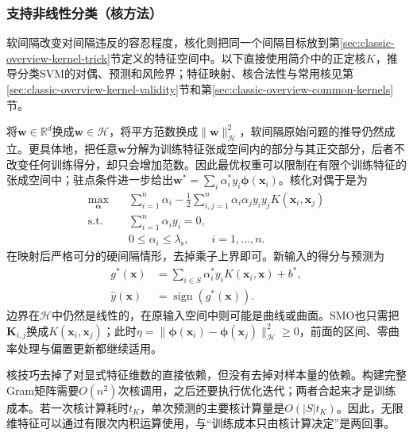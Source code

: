 \subsubsection{支持非线性分类（核方法）}
\label{sec:classification-svm-kernels}

软间隔改变对间隔违反的容忍程度，核化则把同一个间隔目标放到第\ref{sec:classic-overview-kernel-trick}节定义的特征空间中。以下直接使用简介中的正定核$K$，推导分类SVM的对偶、预测和风险界；特征映射、核合法性与常用核见第\ref{sec:classic-overview-kernel-validity}节和第\ref{sec:classic-overview-common-kernels}节。

将$\bm{w}\in\mathbb{R}^d$换成$\bm{w}\in\mathcal{H}$，将平方范数换成$\lVert\bm{w}\rVert_{\mathcal{H}}^2$，软间隔原始问题的推导仍然成立。更具体地，把任意$\bm{w}$分解为训练特征张成空间内的部分与其正交部分，后者不改变任何训练得分，却只会增加范数。因此最优权重可以限制在有限个训练特征的张成空间中；驻点条件进一步给出$\bm{w}^{\ast}=\sum_i\alpha_i^{\ast}y_i\bm{\phi}(\bm{x}_i)$。核化对偶于是为
\begin{equation}
  \begin{aligned}
    \max_{\bm{\alpha}}\quad&
      \sum_{i=1}^n\alpha_i
       -\frac12\sum_{i,j=1}^n
          \alpha_i\alpha_j y_i y_j
          K(\bm{x}_i,\bm{x}_j)\\
    \text{s.t.}\quad&
      \sum_{i=1}^n\alpha_i y_i=0,\\
    &0\le\alpha_i\le\lambda_{\mathrm{s}},
      \qquad i=1,\ldots,n.
  \end{aligned}
  \label{eq:classification-svm-kernel-dual}
\end{equation}
在映射后严格可分的硬间隔情形，去掉乘子上界即可。新输入的得分与预测为
\begin{equation}
  \begin{aligned}
    g^{\ast}(\bm{x})
      &=\sum_{i\in S}\alpha_i^{\ast}y_i
         K(\bm{x}_i,\bm{x})+b^{\ast},\\
    \hat y(\bm{x})&=\operatorname{sign}(g^{\ast}(\bm{x})).
  \end{aligned}
  \label{eq:classification-svm-kernel-prediction}
\end{equation}
边界在$\mathcal{H}$中仍然是线性的，在原输入空间中则可能是曲线或曲面。SMO也只需把$\bm{K}_{i,j}$换成$K(\bm{x}_i,\bm{x}_j)$；此时$\eta=\lVert\bm{\phi}(\bm{x}_i)-\bm{\phi}(\bm{x}_j)\rVert_{\mathcal{H}}^2\ge0$，前面的区间、零曲率处理与偏置更新都继续适用。

核技巧去掉了对显式特征维数的直接依赖，但没有去掉对样本量的依赖。构建完整Gram矩阵需要$O(n^2)$次核调用，之后还要执行优化迭代；两者合起来才是训练成本。若一次核计算耗时$t_K$，单次预测的主要核计算量是$O(|S|t_K)$。因此，无限维特征可以通过有限次内积运算使用，与“训练成本只由核计算决定”是两回事。

